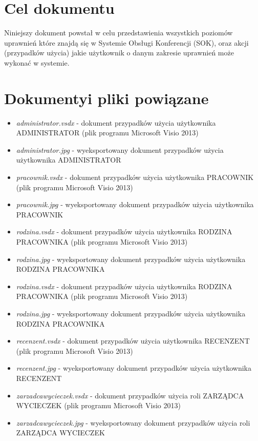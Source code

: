 ﻿\section{Cel dokumentu}
\suppressfloats[t]

Niniejszy dokument powstał w celu przedstawienia wszystkich poziomów uprawnień które znajdą się w Systemie Obsługi Konferencji (SOK), oraz akcji (przypadków użycia) jakie użytkownik o danym zakresie uprawnień może wykonać w systemie. 

\section{Dokumentyi pliki powiązane}

\begin{itemize}
  \item \textit{administrator.vsdx} - dokument przypadków użycia użytkownika ADMINISTRATOR (plik programu Microsoft Visio 2013)
  \item \textit{administrator.jpg} - wyeksportowany dokument przypadków użycia użytkownika ADMINISTRATOR
  \item \textit{pracownik.vsdx} - dokument przypadków użycia użytkownika PRACOWNIK (plik programu Microsoft Visio 2013)
  \item \textit{pracownik.jpg} - wyeksportowany dokument przypadków użycia użytkownika PRACOWNIK
  \item \textit{rodzina.vsdx} - dokument przypadków użycia użytkownika RODZINA PRACOWNIKA (plik programu Microsoft Visio 2013)
  \item \textit{rodzina.jpg} - wyeksportowany dokument przypadków użycia użytkownika RODZINA PRACOWNIKA 
  \item \textit{rodzina.vsdx} - dokument przypadków użycia użytkownika RODZINA PRACOWNIKA (plik programu Microsoft Visio 2013)
  \item \textit{rodzina.jpg} - wyeksportowany dokument przypadków użycia użytkownika RODZINA PRACOWNIKA 
  \item \textit{recenzent.vsdx} - dokument przypadków użycia użytkownika RECENZENT (plik programu Microsoft Visio 2013)
  \item \textit{recenzent.jpg} - wyeksportowany dokument przypadków użycia użytkownika RECENZENT 
  \item \textit{zarzadcawycieczek.vsdx} - dokument przypadków użycia roli ZARZĄDCA WYCIECZEK (plik programu Microsoft Visio 2013)
  \item \textit{zarzadcawycieczek.jpg} - wyeksportowany dokument przypadków użycia roli ZARZĄDCA WYCIECZEK
\end{itemize}

